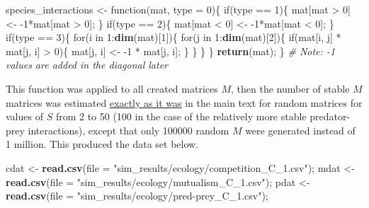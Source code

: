 \documentclass[]{article}
\newenvironment{Shaded}{\begin{snugshade}}{\end{snugshade}}
\newcommand{\KeywordTok}[1]{\textcolor[rgb]{0.13,0.29,0.53}{\textbf{{#1}}}}
\newcommand{\DataTypeTok}[1]{\textcolor[rgb]{0.13,0.29,0.53}{{#1}}}
\newcommand{\DecValTok}[1]{\textcolor[rgb]{0.00,0.00,0.81}{{#1}}}
\newcommand{\StringTok}[1]{\textcolor[rgb]{0.31,0.60,0.02}{{#1}}}
\newcommand{\CommentTok}[1]{\textcolor[rgb]{0.56,0.35,0.01}{\textit{{#1}}}}
\newcommand{\NormalTok}[1]{{#1}}
\begin{document}
\begin{Shaded}
\begin{Highlighting}[]
\NormalTok{species_interactions <-}\StringTok{ }\NormalTok{function(mat, }\DataTypeTok{type =} \DecValTok{0}\NormalTok{)\{}
    \NormalTok{if(type ==}\StringTok{ }\DecValTok{1}\NormalTok{)\{}
        \NormalTok{mat[mat >}\StringTok{ }\DecValTok{0}\NormalTok{] <-}\StringTok{ }\NormalTok{-}\DecValTok{1}\NormalTok{*mat[mat >}\StringTok{ }\DecValTok{0}\NormalTok{];}
    \NormalTok{\}}
    \NormalTok{if(type ==}\StringTok{ }\DecValTok{2}\NormalTok{)\{}
        \NormalTok{mat[mat <}\StringTok{ }\DecValTok{0}\NormalTok{] <-}\StringTok{ }\NormalTok{-}\DecValTok{1}\NormalTok{*mat[mat <}\StringTok{ }\DecValTok{0}\NormalTok{];}
    \NormalTok{\}}
    \NormalTok{if(type ==}\StringTok{ }\DecValTok{3}\NormalTok{)\{}
        \NormalTok{for(i in }\DecValTok{1}\NormalTok{:}\KeywordTok{dim}\NormalTok{(mat)[}\DecValTok{1}\NormalTok{])\{}
            \NormalTok{for(j in }\DecValTok{1}\NormalTok{:}\KeywordTok{dim}\NormalTok{(mat)[}\DecValTok{2}\NormalTok{])\{}
                \NormalTok{if(mat[i, j] *}\StringTok{ }\NormalTok{mat[j, i] >}\StringTok{ }\DecValTok{0}\NormalTok{)\{}
                    \NormalTok{mat[j, i] <-}\StringTok{ }\NormalTok{-}\DecValTok{1} \NormalTok{*}\StringTok{ }\NormalTok{mat[j, i];}
                \NormalTok{\}}
            \NormalTok{\}}
        \NormalTok{\}}
    \NormalTok{\}}
    \KeywordTok{return}\NormalTok{(mat);}
\NormalTok{\} }\CommentTok{# Note: -1 values are added in the diagonal later}
\end{Highlighting}
\end{Shaded}

This function was applied to all created matrices \(M\), then the number
of stable \(M\) matrices was estimated \protect\hyperlink{IncrS}{exactly
as it was} in the main text for random matrices for values of \(S\) from
2 to 50 (100 in the case of the relatively more stable predator-prey
interactions), except that only 100000 random \(M\) were generated
instead of 1 million. This produced the data set below.

\begin{Shaded}
\begin{Highlighting}[]
\NormalTok{cdat <-}\StringTok{ }\KeywordTok{read.csv}\NormalTok{(}\DataTypeTok{file =} \StringTok{"sim_results/ecology/competition_C_1.csv"}\NormalTok{);}
\NormalTok{mdat <-}\StringTok{ }\KeywordTok{read.csv}\NormalTok{(}\DataTypeTok{file =} \StringTok{"sim_results/ecology/mutualism_C_1.csv"}\NormalTok{);}
\NormalTok{pdat <-}\StringTok{ }\KeywordTok{read.csv}\NormalTok{(}\DataTypeTok{file =} \StringTok{"sim_results/ecology/pred-prey_C_1.csv"}\NormalTok{);}
\end{Highlighting}
\end{Shaded}
\end{document}
